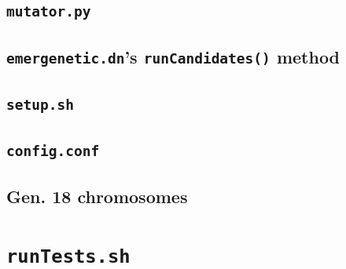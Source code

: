 \documentclass[compsoc,12pt,a4paper]{IEEEtran}
\begin{document}
			\newpage
			
			\subsection{\lstinline|mutator.py|}
			\label{appendix:genetic}
			
			
			\subsection{\lstinline|emergenetic.dn|'s \lstinline|runCandidates()| method}
			\label{appendix:runcand}
			
			
			\subsection{\lstinline|setup.sh|}
			\label{appendix:setup}
			
			
			\subsection{\lstinline|config.conf|}
			\label{appendix:settings}
			
			
			\subsection{Gen. 18 chromosomes}
			\label{appendix:chromosomes}
			
		
		\newpage
		
		\section{\lstinline|runTests.sh|}
		\label{appendix:bash}
		
\end{document}
